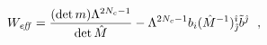 \begin{equation}
  \label{eq:33}
  W_{\it eff} = \frac{(\det m) \Lambda^{2N_c-1}}{\det \hat{M}}
  - \Lambda^{2N_c-1} b_i (\hat{M}^{-1})^{{\hat \imath}}_{{\hat \jmath}}
\tilde{b}^{{\hat \jmath}}~~,
\end{equation}

